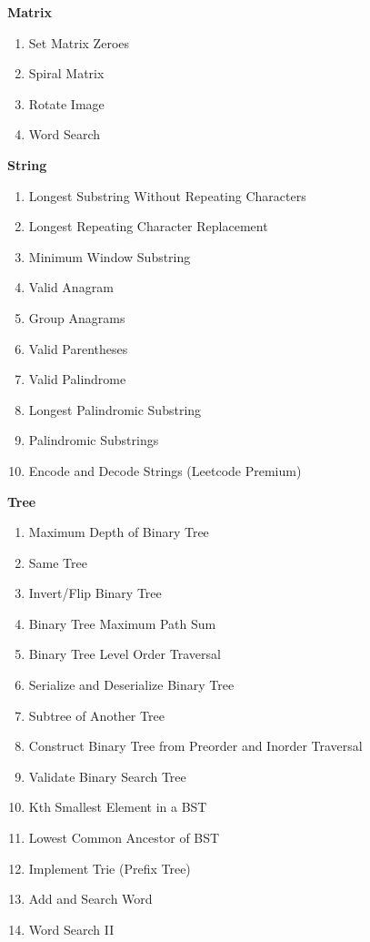 \documentclass[24pt, a4]{article}
\begin{document}
\begin{multicols}{2}

\textbf{Matrix}
\begin{enumerate}
    \item{Set Matrix Zeroes}
    \item{Spiral Matrix}
    \item{Rotate Image}
    \item{Word Search}
\end{enumerate}

\textbf{String}
\begin{enumerate}
    \item{Longest Substring Without Repeating Characters}
    \item{Longest Repeating Character Replacement}
    \item{Minimum Window Substring}
    \item{Valid Anagram}
    \item{Group Anagrams}
    \item{Valid Parentheses}
    \item{Valid Palindrome}
    \item{Longest Palindromic Substring}
    \item{Palindromic Substrings}
    \item{Encode and Decode Strings (Leetcode Premium)}
\end{enumerate}

\columnbreak

\textbf{Tree}
\begin{enumerate}
    \item{Maximum Depth of Binary Tree}
    \item{Same Tree}
    \item{Invert/Flip Binary Tree}
    \item{Binary Tree Maximum Path Sum}
    \item{Binary Tree Level Order Traversal}
    \item{Serialize and Deserialize Binary Tree}
    \item{Subtree of Another Tree}
    \item{Construct Binary Tree from Preorder and Inorder Traversal}
    \item{Validate Binary Search Tree}
    \item{Kth Smallest Element in a BST}
    \item{Lowest Common Ancestor of BST}
    \item{Implement Trie (Prefix Tree)}
    \item{Add and Search Word}
    \item{Word Search II}
\end{enumerate}

\end{multicols}
\end{document}
